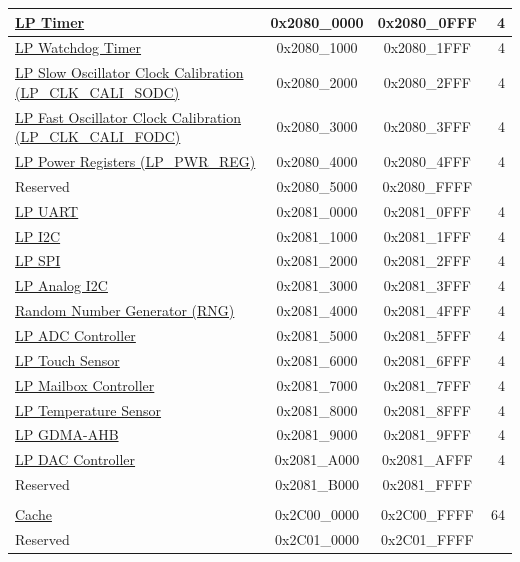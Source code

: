 \begin{ThreePartTable}
\begin{longtable}[c]{ |p{7cm}|c|c|r| }
    \hyperref[mod:rtctimer]{LP Timer} & 0x2080\_0000 & 0x2080\_0FFF &   4\\\hline
    \hyperref[mod:wdt]{LP Watchdog Timer} & 0x2080\_1000 & 0x2080\_1FFF &   4\\\hline
    \hyperref[mod:resclk]{LP Slow Oscillator Clock Calibration (LP\_CLK\_CALI\_SODC)} & 0x2080\_2000 & 0x2080\_2FFF &   4\\\hline
    \hyperref[mod:resclk]{LP Fast Oscillator Clock Calibration (LP\_CLK\_CALI\_FODC)} & 0x2080\_3000 & 0x2080\_3FFF &   4\\\hline
    \hyperref[mod:lowpowm]{LP Power Registers (LP\_PWR\_REG)} & 0x2080\_4000 & 0x2080\_4FFF &   4\\\hline
        \rowcolor{gray!25}  Reserved        & 0x2080\_5000 & 0x2080\_FFFF &    \\\hline
    \hyperref[mod:uart]{LP UART} & 0x2081\_0000 & 0x2081\_0FFF &   4\\\hline
    \hyperref[mod:i2c]{LP I2C} & 0x2081\_1000 & 0x2081\_1FFF &   4\\\hline
    \hyperref[mod:spi]{LP SPI} & 0x2081\_2000 & 0x2081\_2FFF &   4\\\hline
    \hyperref[mod:lowpowm]{LP Analog I2C} & 0x2081\_3000 & 0x2081\_3FFF &   4\\\hline
    \hyperref[mod:rng]{Random Number Generator (RNG)} & 0x2081\_4000 & 0x2081\_4FFF &   4\\\hline
    \hyperref[mod:adc]{LP ADC Controller} & 0x2081\_5000 & 0x2081\_5FFF &   4\\\hline
    \hyperref[mod:tchsen]{LP Touch Sensor} & 0x2081\_6000 & 0x2081\_6FFF &   4\\\hline
    \hyperref[mod:lpmailbox]{LP Mailbox Controller} & 0x2081\_7000 & 0x2081\_7FFF &   4\\\hline
    \hyperref[mod:tmpsen]{LP Temperature Sensor} & 0x2081\_8000 & 0x2081\_8FFF &   4\\\hline
    \hyperref[mod:dma]{LP GDMA-AHB} & 0x2081\_9000 & 0x2081\_9FFF &   4\\\hline
    \hyperref[mod:dac]{LP DAC Controller} & 0x2081\_A000 & 0x2081\_AFFF &   4\\\hline
        \rowcolor{gray!25}  Reserved        & 0x2081\_B000 & 0x2081\_FFFF &    \\\hline

        \rowcolor{lightgray}\multicolumn{4}{|l|}{\textbf{CPU Peripherals}}\\\hline
    \hyperref[mod:cache]{Cache}           & 0x2C00\_0000 & 0x2C00\_FFFF &  64\\\hline
        \rowcolor{gray!25}  Reserved        & 0x2C01\_0000 & 0x2C01\_FFFF &    \\\hline


\end{longtable}
\end{ThreePartTable}
